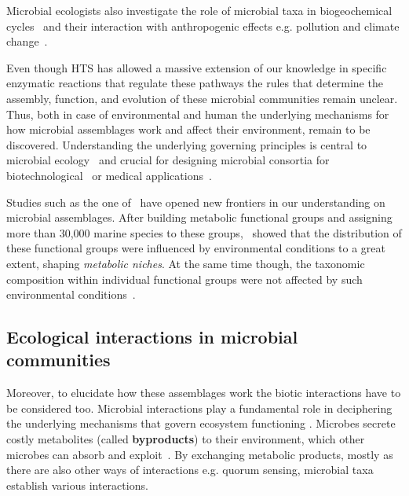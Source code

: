       Microbial ecologists also investigate the role of microbial taxa in 
      biogeochemical cycles~\cite{falkowski2008microbial} and their interaction 
      with anthropogenic effects e.g. pollution and climate change~\cite{cavicchioli2019scientists}.

      Even though HTS has allowed a massive extension of our knowledge in  
      specific enzymatic reactions that regulate these pathways the rules that determine 
      the assembly, function, and evolution of these microbial communities remain unclear. 
      Thus, both in case of environmental and human
      the underlying mechanisms for how microbial assemblages work and affect their environment, remain to be discovered.
      Understanding the underlying governing principles is central to microbial ecology~\cite{giri2021metabolic} and crucial for designing microbial consortia for biotechnological~\cite{giri2020harnessing} or medical applications~\cite{kong2018designing}.

      Studies such as the one of~\citeauthor{louca2016decoupling}
      have opened new frontiers in our understanding on microbial assemblages. 
      After building metabolic functional groups and assigning more than 30,000 marine 
      species to these groups,~\citeauthor{louca2016decoupling} showed 
      that the distribution of these functional groups were influenced by environmental 
      conditions to a great extent, shaping \textit{metabolic niches}.
      At the same time though, the taxonomic composition within individual functional groups
      were not affected by such environmental conditions~\cite{louca2016decoupling}.

   \subsection{Ecological interactions in microbial communities}
   \label{subsec:ecol_interactions}
      Moreover, to elucidate how these assemblages work the biotic interactions have to be 
      considered too. 
      Microbial interactions play a fundamental role in deciphering the underlying mechanisms that govern ecosystem functioning \cite{braga2016microbial, faust2012microbial}. 
      Microbes secrete costly metabolites (called \textbf{byproducts}) to their environment, 
      which other microbes can absorb and exploit~\cite{pacheco2019costless}.
      By exchanging metabolic products, mostly as there are also other ways of interactions 
      e.g. quorum sensing, microbial taxa establish various interactions. 
      
